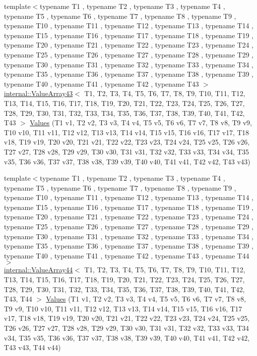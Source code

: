 \begin{DoxyCompactItemize}
\item 
{\footnotesize template$<$typename T1 , typename T2 , typename T3 , typename T4 , typename T5 , typename T6 , typename T7 , typename T8 , typename T9 , typename T10 , typename T11 , typename T12 , typename T13 , typename T14 , typename T15 , typename T16 , typename T17 , typename T18 , typename T19 , typename T20 , typename T21 , typename T22 , typename T23 , typename T24 , typename T25 , typename T26 , typename T27 , typename T28 , typename T29 , typename T30 , typename T31 , typename T32 , typename T33 , typename T34 , typename T35 , typename T36 , typename T37 , typename T38 , typename T39 , typename T40 , typename T41 , typename T42 , typename T43 $>$ }\\\mbox{\hyperlink{classtesting_1_1internal_1_1ValueArray43}{internal\+::\+Value\+Array43}}$<$ T1, T2, T3, T4, T5, T6, T7, T8, T9, T10, T11, T12, T13, T14, T15, T16, T17, T18, T19, T20, T21, T22, T23, T24, T25, T26, T27, T28, T29, T30, T31, T32, T33, T34, T35, T36, T37, T38, T39, T40, T41, T42, T43 $>$ \mbox{\hyperlink{namespacetesting_a316b2e13e635215ac89a50315bb66d81}{Values}} (T1 v1, T2 v2, T3 v3, T4 v4, T5 v5, T6 v6, T7 v7, T8 v8, T9 v9, T10 v10, T11 v11, T12 v12, T13 v13, T14 v14, T15 v15, T16 v16, T17 v17, T18 v18, T19 v19, T20 v20, T21 v21, T22 v22, T23 v23, T24 v24, T25 v25, T26 v26, T27 v27, T28 v28, T29 v29, T30 v30, T31 v31, T32 v32, T33 v33, T34 v34, T35 v35, T36 v36, T37 v37, T38 v38, T39 v39, T40 v40, T41 v41, T42 v42, T43 v43)
\item 
{\footnotesize template$<$typename T1 , typename T2 , typename T3 , typename T4 , typename T5 , typename T6 , typename T7 , typename T8 , typename T9 , typename T10 , typename T11 , typename T12 , typename T13 , typename T14 , typename T15 , typename T16 , typename T17 , typename T18 , typename T19 , typename T20 , typename T21 , typename T22 , typename T23 , typename T24 , typename T25 , typename T26 , typename T27 , typename T28 , typename T29 , typename T30 , typename T31 , typename T32 , typename T33 , typename T34 , typename T35 , typename T36 , typename T37 , typename T38 , typename T39 , typename T40 , typename T41 , typename T42 , typename T43 , typename T44 $>$ }\\\mbox{\hyperlink{classtesting_1_1internal_1_1ValueArray44}{internal\+::\+Value\+Array44}}$<$ T1, T2, T3, T4, T5, T6, T7, T8, T9, T10, T11, T12, T13, T14, T15, T16, T17, T18, T19, T20, T21, T22, T23, T24, T25, T26, T27, T28, T29, T30, T31, T32, T33, T34, T35, T36, T37, T38, T39, T40, T41, T42, T43, T44 $>$ \mbox{\hyperlink{namespacetesting_a42848f3794e196c5a74f4b21db0752dd}{Values}} (T1 v1, T2 v2, T3 v3, T4 v4, T5 v5, T6 v6, T7 v7, T8 v8, T9 v9, T10 v10, T11 v11, T12 v12, T13 v13, T14 v14, T15 v15, T16 v16, T17 v17, T18 v18, T19 v19, T20 v20, T21 v21, T22 v22, T23 v23, T24 v24, T25 v25, T26 v26, T27 v27, T28 v28, T29 v29, T30 v30, T31 v31, T32 v32, T33 v33, T34 v34, T35 v35, T36 v36, T37 v37, T38 v38, T39 v39, T40 v40, T41 v41, T42 v42, T43 v43, T44 v44)

\end{DoxyCompactItemize}
